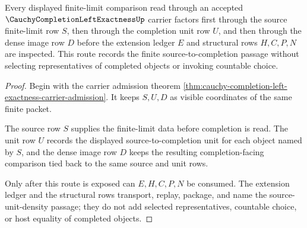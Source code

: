 \begin{theorem}
\label{thm:cauchy-completion-left-exactness-unit-density-route}
Every displayed finite-limit comparison read through an accepted $\CauchyCompletionLeftExactnessUp$ carrier factors first through the source finite-limit row $S$, then through the completion unit row $U$, and then through the dense image row $D$ before the extension ledger $E$ and structural rows $H,C,P,N$ are inspected. This route records the finite source-to-completion passage without selecting representatives of completed objects or invoking countable choice.
\end{theorem}
\begin{proof}
Begin with the carrier admission theorem \autoref{thm:cauchy-completion-left-exactness-carrier-admission}. It keeps $S,U,D$ as visible coordinates of the same finite packet.

The source row $S$ supplies the finite-limit data before completion is read. The unit row $U$ records the displayed source-to-completion unit for each object named by $S$, and the dense image row $D$ keeps the resulting completion-facing comparison tied back to the same source and unit rows.

Only after this route is exposed can $E,H,C,P,N$ be consumed. The extension ledger and the structural rows transport, replay, package, and name the source-unit-density passage; they do not add selected representatives, countable choice, or host equality of completed objects.
\end{proof}

